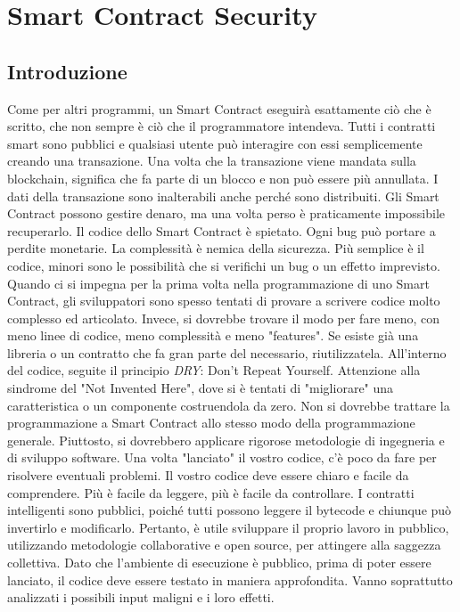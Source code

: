\chapter{Smart Contract Security}

\section{Introduzione}

Come per altri programmi, un Smart Contract eseguirà esattamente ciò che è scritto,
che non sempre è ciò che il programmatore intendeva. Tutti i contratti smart sono
pubblici e qualsiasi utente può interagire con essi semplicemente creando una
transazione.
Una volta che la transazione viene mandata sulla blockchain, significa che fa parte
di un blocco e non può essere più annullata.
I dati della transazione sono inalterabili anche perché
sono distribuiti.
Gli Smart Contract possono gestire denaro, ma una volta perso è praticamente
impossibile recuperarlo.
Il codice dello Smart Contract è spietato. Ogni bug può portare a perdite
monetarie.
La complessità è nemica della sicurezza. Più semplice è il codice,
minori sono le possibilità
che si verifichi un bug o un effetto imprevisto. Quando ci si impegna per la
prima volta nella
programmazione di uno Smart Contract, gli sviluppatori sono spesso tentati di
provare a scrivere codice molto complesso ed articolato.
Invece, si dovrebbe trovare il modo per fare meno, con meno linee di
codice, meno complessità e meno "features".
Se esiste già una libreria o un contratto che fa gran parte del necessario,
riutilizzatela.
All'interno del codice, seguite il principio \textit{DRY}: Don't Repeat Yourself.
Attenzione alla sindrome del "Not Invented Here", dove si è tentati di
"migliorare" una caratteristica o un componente costruendola da zero.
Non si dovrebbe trattare la programmazione a Smart Contract allo stesso modo della
programmazione generale. Piuttosto, si dovrebbero applicare rigorose metodologie di
ingegneria e di sviluppo software.
Una volta "lanciato" il vostro codice, c'è poco da fare per risolvere eventuali
problemi.
Il vostro codice deve essere chiaro e facile da comprendere.
Più è facile da leggere, più è
facile da controllare.
I contratti intelligenti sono pubblici, poiché tutti possono leggere il bytecode
e chiunque può
invertirlo e modificarlo. Pertanto, è utile sviluppare il proprio lavoro in
pubblico, utilizzando
metodologie collaborative e open source, per attingere alla saggezza collettiva.
Dato che l'ambiente di esecuzione è pubblico, prima di poter essere lanciato,
il codice deve essere
testato in maniera approfondita.
Vanno soprattutto analizzati i possibili input maligni e i loro effetti.

